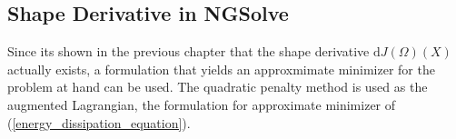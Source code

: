 
\subsection{Shape Derivative in NGSolve}
Since its shown in the previous chapter that the shape derivative $\mathrm{d}J(\Omega)(X)$ actually exists, a formulation
that yields an approxmimate minimizer for the problem at hand can be used. The quadratic penalty method is used 
as the augmented Lagrangian, the formulation for approximate minimizer of (\ref*{energy_dissipation_equation}).
